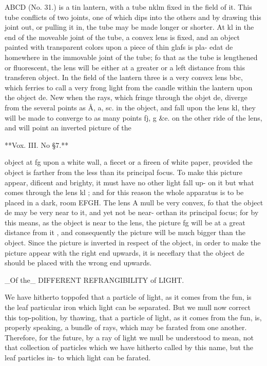 \documentclass{article}
\begin{document}
ABCD (No. 31.) is a tin lantern, with a tube nklm fixed in the field of it. This tube conflicts of two joints, one of which dips into the others and by drawing this joint out, or pulling it in, the tube may be made longer or shorter. At kl in the end of the moveable joint of the tube, a convex lens is fixed, and an object painted with transparent colors upon a piece of thin glafs is pla- edat de homewhere in the immovable joint of the tube; fo that as the tube is lengthened or fluorescent, the lens will be either at a greater or a left distance from this transferen object. In the field of the lantern three is a very convex lens bbc, which ferries to call a very frong light from the candle within the lantern upon the object de. New when the rays, which fringe through the objet de, diverge from the several points as Å, a, sc. in the object, and fall upon the lens kl, they will be made to converge to as many points fj, g \&e. on the other ride of the lens, and will point an inverted picture of the

**Vox. III. No §7.**

object at fg upon a white wall, a fiecet or a fireen of white paper, provided the object is farther from the less than its principal focus. To make this picture appear, dificent and brighty, it must have no other light fall up- on it but what comes through the lens kl ; and for this reason the whole apparatus is to be placed in a dark, room EFGH. The lens A mull be very convex, fo that the object de may be very near to it, and yet not be near- orthan its principal focus; for by this means, as the object is near to the lens, the picture fg will be at a great distance from it , and consequently the picture will be much bigger than the object. Since the picture is inverted in respect of the object, in order to make the picture appear with the right end upwards, it is neceflary that the object de should be placed with the wrong end upwards.

\_Of the\_ DIFFERENT REFRANGIBILITY of LIGHT.

We have hitherto toppofed that a particle of light, as it comes from the fun, is the leaf particular iron which light can be separated. But we mull now correct this top-polition, by thawing, that a particle of light, as it comes from the fun, is, properly speaking, a bundle of rays, which may be farated from one another. Therefore, for the future, by a ray of light we mull be understood to mean, not that collection of particles which we have hitherto called by this name, but the leaf particles in- to which light can be farated.
\end{document}
